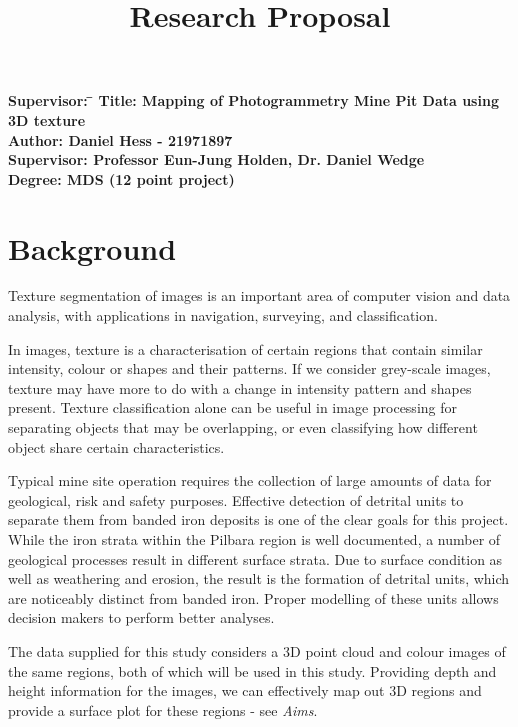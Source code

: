 \documentclass[11pt, a4paper]{article}
\title{Research Proposal}
\date{}
\begin{document}
\maketitle

\begin{tabbing}
\bf Supervisor: \=\kill
\bf Title:   \> Mapping of Photogrammetry Mine Pit Data using 3D texture \\
\bf Author:  \> Daniel Hess - 21971897 \\
\bf Supervisor:   \> Professor Eun-Jung Holden, Dr. Daniel Wedge \\
\bf Degree:   \> MDS (12 point project)
\end{tabbing}

\section*{Background}

Texture segmentation of images is an important area of computer vision and data analysis, with applications in navigation, surveying, and classification.

In images, texture is a characterisation of certain regions that contain similar intensity, colour or shapes and their patterns. If we consider grey-scale images, texture may have more to do with a change in intensity pattern and shapes present. Texture classification alone can be useful in image processing for separating objects that may be overlapping, or even classifying how different object share certain characteristics.

Typical mine site operation requires the collection of large amounts of data for geological, risk and safety purposes. Effective detection of detrital units to separate them from banded iron deposits is one of the clear goals for this project. While the iron strata within the Pilbara region is well documented, a number of geological processes result in different surface strata. Due to surface condition as well as weathering and erosion, the result is the formation of detrital units, which are noticeably distinct from banded iron. Proper modelling of these units allows decision makers to perform better analyses.

The data supplied for this study considers a 3D point cloud and colour images of the same regions, both of which will be used in this study. Providing depth and height information for the images, we can effectively map out 3D regions and provide a surface plot for these regions - see \textit{Aims}.
\end{document}
